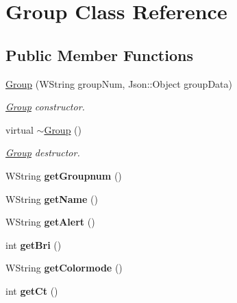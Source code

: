 \hypertarget{classGroup}{}\section{Group Class Reference}
\label{classGroup}
\subsection*{Public Member Functions}
\begin{DoxyCompactItemize}
\item 
\hyperlink{classGroup_a590b0514381a301636531cddb6902342}{Group} (W\+String group\+Num, Json\+::\+Object group\+Data)
\begin{DoxyCompactList}\small\item\em \hyperlink{classGroup}{Group} constructor. \end{DoxyCompactList}\item 
virtual \hyperlink{classGroup_aed00a22ff227ee2657ae44a5cbcedf7c}{$\sim$\+Group} ()\hypertarget{classGroup_aed00a22ff227ee2657ae44a5cbcedf7c}{}\label{classGroup_aed00a22ff227ee2657ae44a5cbcedf7c}

\begin{DoxyCompactList}\small\item\em \hyperlink{classGroup}{Group} destructor. \end{DoxyCompactList}\item 
W\+String {\bfseries get\+Groupnum} ()\hypertarget{classGroup_a1cc1c807eb94eda9f0d7f52f20cc15cf}{}\label{classGroup_a1cc1c807eb94eda9f0d7f52f20cc15cf}

\item 
W\+String {\bfseries get\+Name} ()\hypertarget{classGroup_a7c66c85f9e17f4e2105ccde041e46efa}{}\label{classGroup_a7c66c85f9e17f4e2105ccde041e46efa}

\item 
W\+String {\bfseries get\+Alert} ()\hypertarget{classGroup_ae482bc5d5e63ade2936b36e3b11aec92}{}\label{classGroup_ae482bc5d5e63ade2936b36e3b11aec92}

\item 
int {\bfseries get\+Bri} ()\hypertarget{classGroup_a0e2391c0c8ba8ea362adbfb6c038e5ac}{}\label{classGroup_a0e2391c0c8ba8ea362adbfb6c038e5ac}

\item 
W\+String {\bfseries get\+Colormode} ()\hypertarget{classGroup_a3d05bff68c94f70e2c8720f141ce4d27}{}\label{classGroup_a3d05bff68c94f70e2c8720f141ce4d27}

\item 
int {\bfseries get\+Ct} ()\hypertarget{classGroup_ab89da05f04279379a720c20bdc46c1d3}{}\label{classGroup_ab89da05f04279379a720c20bdc46c1d3}


\end{DoxyCompactItemize}
